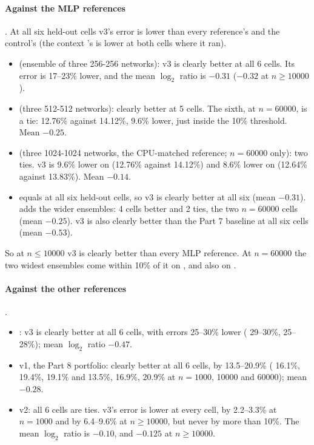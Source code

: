 \paragraph{Against the MLP references} . At all six held-out cells v3's error is lower than every reference's and the control's (the context 's is lower at both  cells where it ran).
\begin{itemize}
\item {} (ensemble of three 256-256 networks): v3 is clearly better at all 6 cells. Its error is 17--23\% lower, and the mean $\log_2$ ratio is $-0.31$ ($-0.32$ at $n\ge10000$).
\item {} (three 512-512 networks): clearly better at 5 cells. The sixth,  at $n=60000$, is a tie: 12.76\% against 14.12\%, 9.6\% lower, just inside the 10\% threshold. Mean $-0.25$.
\item {} (three 1024-1024 networks, the CPU-matched reference; $n=60000$ only): two ties. v3 is 9.6\% lower on  (12.76\% against 14.12\%) and 8.6\% lower on  (12.64\% against 13.83\%). Mean $-0.14$.
\item {} equals  at all six held-out cells, so v3 is clearly better at all six (mean $-0.31$).  adds the wider ensembles: 4 cells better and 2 ties, the two $n=60000$ cells (mean $-0.25$). v3 is also clearly better than the Part 7 baseline  at all six cells (mean $-0.53$).
\end{itemize}

So at $n\le10000$ v3 is clearly better than every MLP reference. At $n=60000$ the two widest ensembles come within 10\% of it on , and  also on .

\paragraph{Against the other references} .
\begin{itemize}
\item {}: v3 is clearly better at all 6 cells, with errors 25--30\% lower ( 29--30\%,  25--28\%); mean $\log_2$ ratio $-0.47$.
\item v1, the Part 8 portfolio: clearly better at all 6 cells, by 13.5--20.9\% ( 16.1\%, 19.4\%, 19.1\% and  13.5\%, 16.9\%, 20.9\% at $n=1000$, 10000 and 60000); mean $-0.28$.
\item v2: all 6 cells are ties. v3's error is lower at every cell, by 2.2--3.3\% at $n=1000$ and by 6.4--9.6\% at $n\ge10000$, but never by more than 10\%. The mean $\log_2$ ratio is $-0.10$, and $-0.125$ at $n\ge10000$.
\end{itemize}


